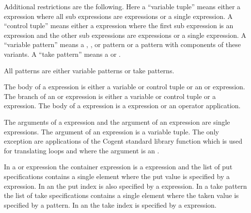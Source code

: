 Additional restrictions are the following. Here a ``variable tuple'' means either a  expression where all
sub expressions are  expressions or a single  expression. A ``control tuple'' means either a
 expression where the first sub expression is an  expression and the other sub expressions
are  expressions or a single  expression. A ``variable pattern'' means a , ,
or  pattern or a  pattern with components of these variants. A ``take pattern'' means
a  or .

All patterns are either variable patterns or take patterns.

The body of a  expression is either a variable or control tuple or an  or  expression.
The branch of an  or  expression is either a variable or control tuple or a  expression.
The body of a  expression is a  expression or an operator application.

The arguments of a  expression and the argument of an  expression are single  expressions.
The argument of an  expression
is a variable tuple. The only exception are applications of the Cogent standard library function  which
is used for translating loops and where the argument is an .

In a  or  expression the container expression is a  expression and the list of put
specifications contains a single element where the put value is specified by a  expression. In an 
the put index is also specified by a  expression. In a take pattern the list of take specifications contains
a single element where the taken value is specified by a  pattern. In an  the take index is
specified by a  expression.


